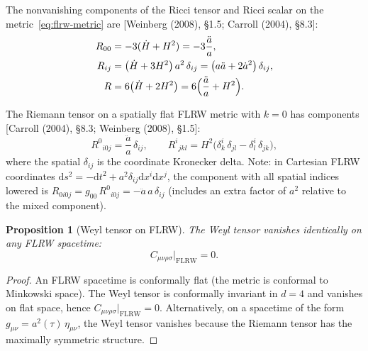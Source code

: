 \documentclass[12pt,a4paper]{article}
\newtheorem{proposition}{Proposition}[section]
\theoremstyle{definition}
\theoremstyle{remark}
\newcommand{\dd}{\mathrm{d}}
\newcommand{\fromlit}[1]{\textcolor{blue!70!black}{\textsf{[#1]}}}
\begin{document}
The nonvanishing components of the Ricci tensor and Ricci scalar on
the metric~\eqref{eq:flrw-metric} are
\fromlit{Weinberg (2008), \S1.5; Carroll (2004), \S8.3}:
\begin{align}
  R_{00} &= -3(\dot{H} + H^2) = -3\frac{\ddot{a}}{a},
  \label{eq:R00}\\
  R_{ij} &= \bigl(\dot{H} + 3H^2\bigr)\,a^2\,\delta_{ij}
  = \bigl(a\ddot{a} + 2\dot{a}^2\bigr)\,\delta_{ij},
  \label{eq:Rij}\\
  R &= 6\bigl(\dot{H} + 2H^2\bigr)
  = 6\Bigl(\frac{\ddot{a}}{a} + H^2\Bigr).
  \label{eq:R-flrw}
\end{align}

The Riemann tensor on a spatially flat FLRW metric with $k = 0$
has components \fromlit{Carroll (2004), \S8.3; Weinberg (2008), \S1.5}:
\begin{equation}\label{eq:Riem-flrw}
  R^0{}_{i0j} = \frac{\ddot{a}}{a}\,\delta_{ij},
  \qquad
  R^i{}_{jkl} = H^2\bigl(\delta^i_k\,\delta_{jl}
  - \delta^i_l\,\delta_{jk}\bigr),
\end{equation}
where the spatial $\delta_{ij}$ is the coordinate Kronecker delta.
Note: in Cartesian FLRW coordinates $\dd s^2 = -\dd t^2 +
a^2\delta_{ij}\dd x^i\dd x^j$, the component with all spatial
indices lowered is $R_{0i0j} = g_{00}\,R^0{}_{i0j} = -\ddot{a}\,a
\,\delta_{ij}$ (includes an extra factor of $a^2$ relative to the
mixed component).

\begin{proposition}[Weyl tensor on FLRW]\label{prop:weyl-flrw}
The Weyl tensor vanishes identically on any FLRW spacetime:
\begin{equation}\label{eq:weyl-zero}
  C_{\mu\nu\rho\sigma}\big|_{\mathrm{FLRW}} = 0.
\end{equation}
\end{proposition}

\begin{proof}
An FLRW spacetime is conformally flat (the metric is conformal to
Minkowski space). The Weyl tensor is conformally invariant in $d = 4$
and vanishes on flat space, hence
$C_{\mu\nu\rho\sigma}|_{\mathrm{FLRW}} = 0$.
Alternatively, on a spacetime of the form $g_{\mu\nu} = a^2(\tau)\,
\eta_{\mu\nu}$, the Weyl tensor vanishes because the Riemann tensor
has the maximally symmetric structure.
\end{proof}
\end{document}
